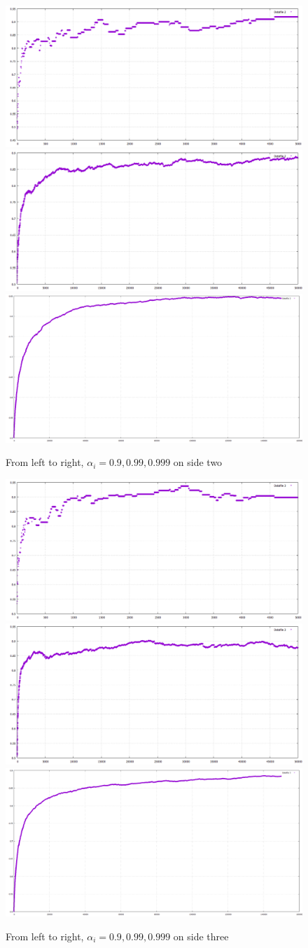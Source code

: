 \documentclass{article}
\begin{document}
\begin{figure}[htp]
\centering
\includegraphics[width=.3\textwidth]{images/ai9side2}\hfill
\includegraphics[width=.3\textwidth]{images/ai99side2}\hfill
\includegraphics[width=.3\textwidth]{images/ai999side2}
\caption{From left to right, $\alpha_i = 0.9, 0.99, 0.999$ on side two}
\label{fig:figure3}
\end{figure}

\begin{figure}[htp]
\centering
\includegraphics[width=.3\textwidth]{images/ai9side3}\hfill
\includegraphics[width=.3\textwidth]{images/ai99side3}\hfill
\includegraphics[width=.3\textwidth]{images/ai999side3}
\caption{From left to right, $\alpha_i = 0.9, 0.99, 0.999$ on side three}
\label{fig:figure3}
\end{figure}
\end{document}

